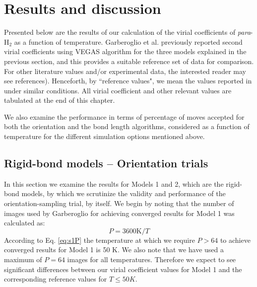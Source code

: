     \section{Results and discussion}
    \label{sec:Results and discussion}
        Presented below are the results of our calculation of the virial coefficients of \emph{para}-H$_2$ as a function of temperature. Garberoglio et al.\cite{Garberoglio2014} previously reported second virial coefficients using VEGAS\cite{Lepage1972} algorithm for the three models explained in the previous section, and this provides a suitable reference set of data for comparison. For other literature values and/or experimental data, the interested reader may see references\cite{Goodwin1963, Patkowski2008, Leachman2009, Sakoda2012, Garberoglio2012, Garberoglio2014}). Henceforth, by ``reference values", we mean the values reported in \cite{Garberoglio2014} under similar conditions. All virial coefficient and other relevant values are tabulated at the end of this chapter.

        We also examine the performance in terms of percentage of moves accepted for both the orientation and the bond length algorithms, considered as a function of temperature for the different simulation options mentioned above.

        \subsection{Rigid-bond models -- Orientation trials}
            In this section we examine the results for Models 1 and 2, which are the rigid-bond models, by which we scrutinize the validity and performance of the orientation-sampling trial, by itself. We begin by noting that the number of images used by Garberoglio for achieving converged results \cite{Patkowski2008} for Model 1 was calculated as:
            \begin{equation}
            \label{eq:s1P}
                P = 3600 \textrm{K}/T
            \end{equation}
According to Eq. \eqref{eq:s1P} the temperature at which we require $P > 64$ to achieve converged results for Model 1 is 50 K. We also note that we have used a maximum of $P = 64$ images for all temperatures. Therefore we expect to see significant differences between our virial coefficient values for Model 1 and the corresponding reference values for $T \le 50 K$.

